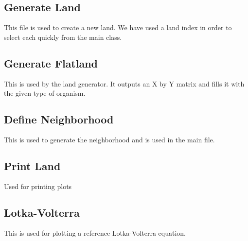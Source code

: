\documentclass[11pt]{article}
\begin{document}
\subsection{Generate Land}
This file is used to create a new land. We have used a land index in order to select each quickly from the main class.

\subsection{Generate Flatland}
This is used by the land generator. It outputs an X by Y matrix and fills it with the given type of organism.

\subsection{Define Neighborhood}
This is used to generate the neighborhood and is used in the main file.

\subsection{Print Land}
Used for printing plots

\subsection{Lotka-Volterra}
This is used for plotting a reference Lotka-Volterra equation.





\end{document}
